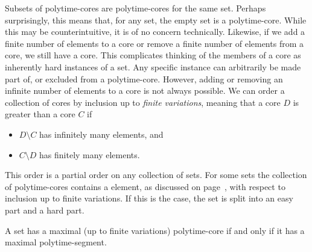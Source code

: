 Subsets of polytime-cores are polytime-cores for the same set.
Perhaps surprisingly, this means that, for any set, the empty set is a polytime-core.
While this may be counterintuitive, it is of no concern technically.
Likewise, if we add a finite number of elements to a core or remove a finite number of elements from a core, we still have a core.
This complicates thinking of the members of a core as inherently hard instances of a set.
Any specific instance can arbitrarily be made part of, or excluded from a polytime-core.
However, adding or removing an infinite number of elements to a core is not always possible.
We can order a collection of cores by inclusion up to \emph{finite variations}, meaning that a core $D$ is greater than a core $C$ if
\begin{itemize}
\item $D \setminus C$ has infinitely many elements, and
\item $C \setminus D$ has finitely many elements.
\end{itemize}
This order is a partial order on any collection of sets.
For some sets the collection of polytime-cores contains a  element, as discussed on page~\pageref{def:maximal}, with respect to inclusion up to finite variations.
If this is the case, the set is split into an easy part and a hard part.
\begin{theorem}
\label{thm:maximal}%
  A set has a maximal (up to finite variations) polytime-core if and only if it has a maximal polytime-segment.
\end{theorem}
